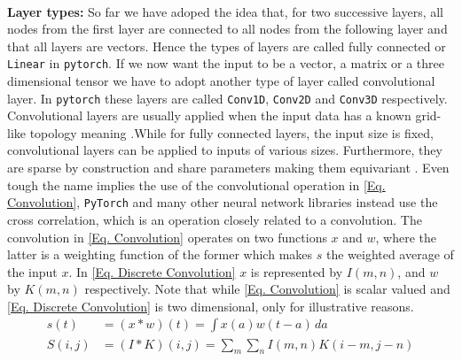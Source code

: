 \\
\textbf{Layer types:} So far we have adoped the idea that, for two successive layers, all nodes from the first layer are connected to all nodes from the following layer and that all layers are vectors. Hence the types of layers are called fully connected or \texttt{Linear} in \texttt{pytorch}\cite{torch_ini}. If we now want the input to be a vector, a matrix or a three dimensional tensor we have to adopt another type of layer called convolutional layer. In \texttt{pytorch} these layers are called \texttt{Conv1D}, \texttt{Conv2D} and \texttt{Conv3D} respectively.  
Convolutional layers are usually applied when the input data has a known grid-like topology meaning \cite{Goodfellow}.While for fully connected layers, the input size is fixed, convolutional layers can be applied to inputs of various sizes. Furthermore, they are sparse by construction and share parameters making them equivariant \cite{Goodfellow}.  Even tough the name implies the use of the convolutional operation in \cref{Eq. Convolution}, \texttt{PyTorch} and many other neural network libraries instead use the cross correlation, which is an operation closely related to a convolution\cite{Goodfellow}\cite{Pytorch website}. The convolution in \ref{Eq. Convolution} operates on two functions \(x\) and \(w\), where the latter is a weighting function of the former which makes \(s\) the weighted average of the input \(x\). In \cref{Eq. Discrete Convolution} \(x\) is represented by \(I(m,n)\), and \(w\) by \(K(m,n)\) respectively. Note that while \cref{Eq. Convolution} is scalar valued and \cref{Eq. Discrete Convolution} is two dimensional, only for illustrative reasons. 
\begin{align}
	s(t) &= (x * w)(t) = \int x(a)w(t-a)\,da \label{Eq. Convolution}\\
	S(i,j) &= (I * K)(i,j) = \sum_{m}\sum_{n}I(m,n)K(i-m,j-n)
	\label{Eq. Discrete Convolution}
\end{align}

